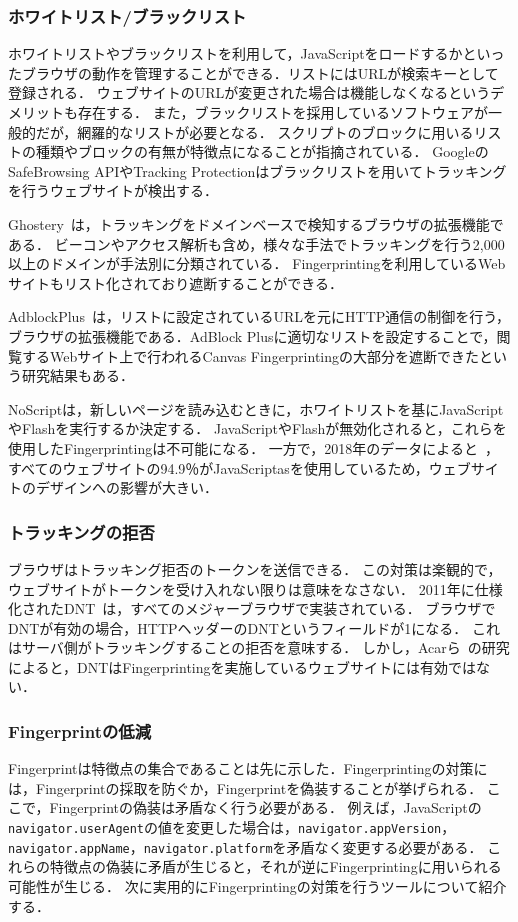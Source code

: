 \subsubsection{ホワイトリスト/ブラックリスト}
ホワイトリストやブラックリストを利用して，JavaScriptをロードするかといったブラウザの動作を管理することができる．リストにはURLが検索キーとして登録される．
ウェブサイトのURLが変更された場合は機能しなくなるというデメリットも存在する．
また，ブラックリストを採用しているソフトウェアが一般的だが，網羅的なリストが必要となる．
スクリプトのブロックに用いるリストの種類やブロックの有無が特徴点になることが指摘されている．
GoogleのSafeBrowsing APIやTracking Protectionはブラックリストを用いてトラッキングを行うウェブサイトが検出する．

Ghostery~\cite{Ghostery}は，トラッキングをドメインベースで検知するブラウザの拡張機能である．
ビーコンやアクセス解析も含め，様々な手法でトラッキングを行う2,000以上のドメインが手法別に分類されている．
Fingerprintingを利用しているWebサイトもリスト化されており遮断することができる．

AdblockPlus~\cite{acar2014web}は，リストに設定されているURLを元にHTTP通信の制御を行う，ブラウザの拡張機能である．AdBlock Plusに適切なリストを設定することで，閲覧するWebサイト上で行われるCanvas Fingerprintingの大部分を遮断できたという研究結果もある．

NoScriptは，新しいページを読み込むときに，ホワイトリストを基にJavaScriptやFlashを実行するか決定する．
JavaScriptやFlashが無効化されると，これらを使用したFingerprintingは不可能になる．
一方で，2018年のデータによると~\cite{javascript_usage}，すべてのウェブサイトの94.9％がJavaScriptasを使用しているため，ウェブサイトのデザインへの影響が大きい．
\subsubsection{トラッキングの拒否}
ブラウザはトラッキング拒否のトークンを送信できる．
この対策は楽観的で，ウェブサイトがトークンを受け入れない限りは意味をなさない．
2011年に仕様化されたDNT~\cite{dnt}は，すべてのメジャーブラウザで実装されている．
ブラウザでDNTが有効の場合，HTTPヘッダーのDNTというフィールドが1になる．
これはサーバ側がトラッキングすることの拒否を意味する．
しかし，Acarら~\cite{acar2013fpdetective}の研究によると，DNTはFingerprintingを実施しているウェブサイトには有効ではない．
\subsubsection{Fingerprintの低減}
Fingerprintは特徴点の集合であることは先に示した．Fingerprintingの対策には，Fingerprintの採取を防ぐか，Fingerprintを偽装することが挙げられる．
ここで，Fingerprintの偽装は矛盾なく行う必要がある．
例えば，JavaScriptの\texttt{navigator.userAgent}の値を変更した場合は，\texttt{navigator.appVersion}，\texttt{navigator.appName}，\texttt{navigator.platform}を矛盾なく変更する必要がある．
これらの特徴点の偽装に矛盾が生じると，それが逆にFingerprintingに用いられる可能性が生じる．
次に実用的にFingerprintingの対策を行うツールについて紹介する．

